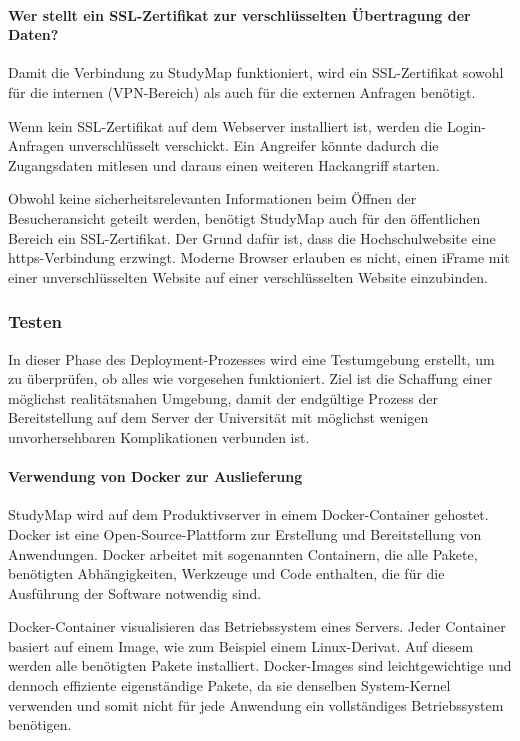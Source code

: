 \paragraph*{Wer stellt ein SSL-Zertifikat zur verschlüsselten Übertragung der Daten?}
Damit die Verbindung zu StudyMap funktioniert, wird ein SSL-Zertifikat sowohl für die internen (VPN-Bereich) als auch für die externen Anfragen benötigt.

Wenn kein SSL-Zertifikat auf dem Webserver installiert ist, werden die Login-Anfragen unverschlüsselt verschickt. Ein Angreifer könnte dadurch die Zugangsdaten mitlesen und daraus einen weiteren Hackangriff starten.

Obwohl keine sicherheitsrelevanten Informationen beim Öffnen der Besucheransicht geteilt werden, benötigt StudyMap auch für den öffentlichen Bereich ein SSL-Zertifikat. Der Grund dafür ist, dass die Hochschulwebsite eine https-Verbindung erzwingt. Moderne Browser erlauben es nicht, einen iFrame mit einer unverschlüsselten Website auf einer verschlüsselten Website einzubinden. \parencite{vyas_mixed_2013}

\subsubsection{Testen}
In dieser Phase des Deployment-Prozesses wird eine Testumgebung erstellt, um zu überprüfen, ob alles wie vorgesehen funktioniert. Ziel ist die Schaffung einer möglichst realitätsnahen Umgebung, damit der endgültige Prozess der Bereitstellung auf dem Server der Universität mit möglichst wenigen unvorhersehbaren Komplikationen verbunden ist.

\paragraph*{Verwendung von Docker zur Auslieferung}
StudyMap wird auf dem Produktivserver in einem Docker-Container gehostet. Docker ist eine Open-Source-Plattform zur Erstellung und Bereitstellung von Anwendungen. Docker arbeitet mit sogenannten Containern, die alle Pakete, benötigten Abhängigkeiten, Werkzeuge und Code enthalten, die für die Ausführung der Software notwendig sind. \parencite{amazon_web_services_inc_was_2023}

Docker-Container visualisieren das Betriebssystem eines Servers. Jeder Container basiert auf einem Image, wie zum Beispiel einem Linux-Derivat. Auf diesem werden alle benötigten Pakete installiert. Docker-Images sind leichtgewichtige und dennoch effiziente eigenständige Pakete, da sie denselben System-Kernel verwenden und somit nicht für jede Anwendung ein vollständiges Betriebssystem benötigen. \parencite{docker_inc_what_2024}

